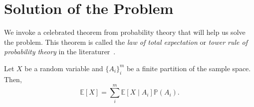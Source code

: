 \section{Solution of the Problem}
\label{sec:solution}


We invoke a celebrated theorem from probability theory that will help us solve
the problem. This theorem is called the \textit{law of total expectation} or
\textit{tower rule of probability theory} in the
literaturer~\cite{bertsekas2002introduction}.

\begin{thm} \label{thm:tower} Let $X$ be a random variable and
    $\{A_i\}_i^m$ be a finite partition of the sample space. Then, 
    \[ \mathbb{E}[X] = \sum_i^m \mathbb{E}\left[ X \mid A_i \right]
    \mathbb{P}(A_i). \]
\end{thm}
%

